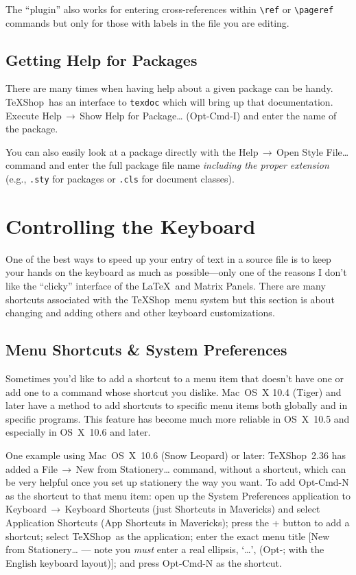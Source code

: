 \documentclass[letterpaper,11pt]{article}
\newcommand{\TS}{\textsf{\TeX Shop}}
\newcommand{\cmd}[1]{\textsf{#1}}
\newcommand{\mnu}[1]{\textsf{#1}}
\newcommand{\To}{\,\(\to\)\,}
\begin{document}
The ``plugin'' also works for entering cross-references within \verb|\ref| or \verb|\pageref| commands but only for those with labels in the file you are editing.

\subsection{Getting Help for Packages}

There are many times when having help about a given package can be handy. \TS\ has an interface to \texttt{texdoc} which will bring up that documentation. Execute \mnu{Help}\To\mnu{Show Help for Package…} (\cmd{Opt-Cmd-I}) and enter the name of the package.

You can also easily look at a package directly with the \mnu{Help}\To\mnu{Open Style File…} command and enter the full package file name \emph{including the proper extension} (e.g., \texttt{.sty} for packages or \texttt{.cls} for document classes).

\section{Controlling the Keyboard}

One of the best ways to speed up your entry of text in a source file is to keep your hands on the keyboard as much as possible---only one of the reasons I don't like the ``clicky'' interface of the \LaTeX\ and Matrix Panels. There are many shortcuts associated with the \TS\ menu system but this section is about changing and adding others and other keyboard customizations.

\subsection{Menu Shortcuts \& System Preferences}

Sometimes you'd like to add a shortcut to a menu item that doesn't have one or add one to a command whose shortcut you dislike. Mac~OS~X 10.4 (Tiger) and later have a method to add shortcuts to specific menu items both globally and in specific programs. This feature has become much more reliable in OS~X~10.5 and especially in OS~X~10.6 and later.

One example using Mac~OS~X~10.6 (Snow Leopard) or later: \TS\ 2.36 has added a \mnu{File}\To\mnu{New from Stationery…} command, without a shortcut, which can be very helpful once you set up stationery the way you want. To add \cmd{Opt-Cmd-N} as the shortcut to that menu item: open up the \textsf{System Preferences} application to \mnu{Keyboard}\To\mnu{Keyboard Shortcuts} (just \mnu{Shortcuts} in \cmd{Mavericks}) and select \mnu{Application Shortcuts} (\mnu{App Shortcuts} in \cmd{Mavericks}); press the \mnu{+} button to add a shortcut; select \TS\ as the application; enter the exact menu title [\mnu{New from Stationery…} --- note you \emph{must} enter a real ellipsis, `…', (\cmd{Opt-;} with the English keyboard layout)]; and press \cmd{Opt-Cmd-N} as the shortcut.
\end{document}
